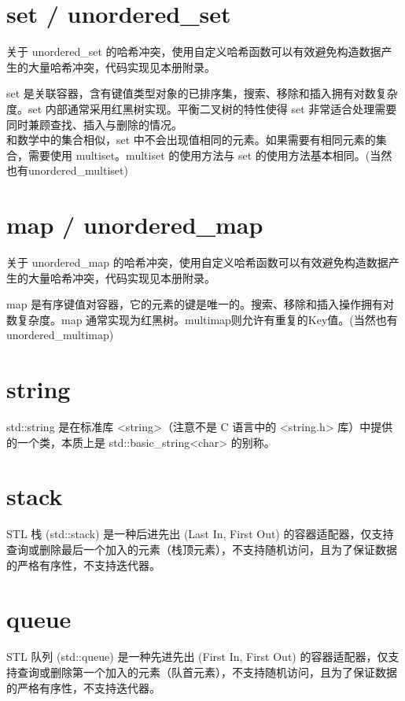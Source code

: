 \section{set / unordered\_set}
关于 unordered\_set 的哈希冲突，使用自定义哈希函数可以有效避免构造数据产生的大量哈希冲突，代码实现见本册附录。

set 是关联容器，含有键值类型对象的已排序集，搜索、移除和插入拥有对数复杂度。set 内部通常采用红黑树实现。平衡二叉树的特性使得 set 非常适合处理需要同时兼顾查找、插入与删除的情况。\\
和数学中的集合相似，set 中不会出现值相同的元素。如果需要有相同元素的集合，需要使用 multiset。multiset 的使用方法与 set 的使用方法基本相同。(当然也有unordered\_multiset)


\section{map / unordered\_map}
关于 unordered\_map 的哈希冲突，使用自定义哈希函数可以有效避免构造数据产生的大量哈希冲突，代码实现见本册附录。

map 是有序键值对容器，它的元素的键是唯一的。搜索、移除和插入操作拥有对数复杂度。map 通常实现为红黑树。multimap则允许有重复的Key值。(当然也有 unordered\_multimap)


\section{string}
std::string 是在标准库 <string>（注意不是 C 语言中的 <string.h> 库）中提供的一个类，本质上是 std::basic\_string<char> 的别称。



\section{stack}
STL 栈 (std::stack) 是一种后进先出 (Last In, First Out) 的容器适配器，仅支持查询或删除最后一个加入的元素（栈顶元素），不支持随机访问，且为了保证数据的严格有序性，不支持迭代器。


\section{queue}
STL 队列 (std::queue) 是一种先进先出 (First In, First Out) 的容器适配器，仅支持查询或删除第一个加入的元素（队首元素），不支持随机访问，且为了保证数据的严格有序性，不支持迭代器。


